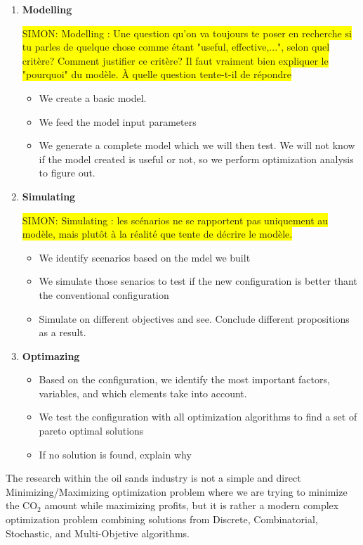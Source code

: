\documentclass[12pt]{article}
\newcommand{\h}[1]{\colorbox{yellow}{#1}}
\begin{document}
\begin{enumerate}
\item {\bf Modelling} 

\h{SIMON: Modelling : Une question qu'on va toujours te poser en recherche si tu parles de quelque chose comme étant "useful, effective,...", selon quel critère? Comment justifier ce critère? Il faut vraiment bien expliquer le "pourquoi" du modèle. À quelle question tente-t-il de répondre}

\begin{itemize}
\item We create a basic model.  
\item We feed the model input parameters
\item We generate a complete model which we will then test. We will not know if the model created is useful or not, so we perform optimization analysis to figure out. 
\end{itemize}

\item {\bf Simulating} 

\h{SIMON: Simulating : les scénarios ne se rapportent pas uniquement au modèle, mais plutôt à la réalité que tente de décrire le modèle.}

\begin{itemize}
\item We identify scenarios based on the mdel we built 
\item We simulate those senarios to test if the new configuration is better thant the conventional configuration
\item Simulate on different objectives and see. Conclude different propositions as a result.
\end{itemize}

\item {\bf Optimazing} 
\begin{itemize}
\item Based on the configuration, we identify the most important factors, variables, and which elements take into account. 
\item We test the configuration with all optimization algorithms to find a set of pareto optimal solutions
\item If no solution is found, explain why
\end{itemize}
\end{enumerate}

The research within the oil sands industry is not a simple and direct Minimizing/Maximizing optimization problem where we are trying to minimize the CO$_2$ amount while maximizing profits, but it is rather a modern complex optimization problem combining solutions from Discrete, Combinatorial, Stochastic, and Multi-Objetive algorithms. \\
\end{document}
